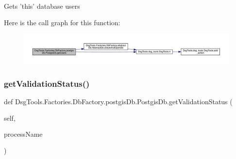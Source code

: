 \begin{DoxyVerb}Gets 'this' database users
\end{DoxyVerb}
 Here is the call graph for this function\+:
\nopagebreak
\begin{figure}[H]
\begin{center}
\leavevmode
\includegraphics[width=350pt]{class_dsg_tools_1_1_factories_1_1_db_factory_1_1postgis_db_1_1_postgis_db_ac17ae70205533589c22ca8824ac246c5_cgraph}
\end{center}
\end{figure}
\mbox{\label{class_dsg_tools_1_1_factories_1_1_db_factory_1_1postgis_db_1_1_postgis_db_ae9935f758bccefcd0b740343ac2b16a8}} 
\subsubsection{\texorpdfstring{get\+Validation\+Status()}{getValidationStatus()}}
{\footnotesize\ttfamily def Dsg\+Tools.\+Factories.\+Db\+Factory.\+postgis\+Db.\+Postgis\+Db.\+get\+Validation\+Status (\begin{DoxyParamCaption}\item[{}]{self,  }\item[{}]{process\+Name }\end{DoxyParamCaption})}

